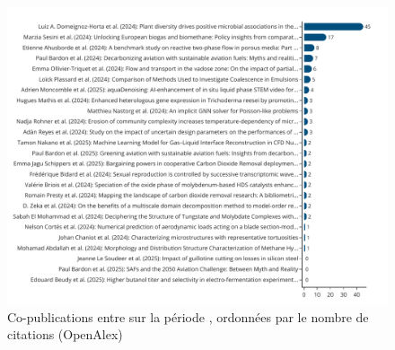 \documentclass[french, 11pt]{dibiso/pubpart}
\begin{document}
\begin{figure}[!h]
  \includegraphics[width=\textwidth]{figures/works_collaborations_citationscount.pdf}
  \caption{Co-publications entre {\entitiesacronym} sur la période {\reportyear}, ordonnées par le nombre de citations (OpenAlex)}
  \label{fig_works_collaborations_citationscount}
\end{figure}

{\footnotesize\workscollaborationscitationscountinfo}




\makelastpagereport
 
\end{document}
